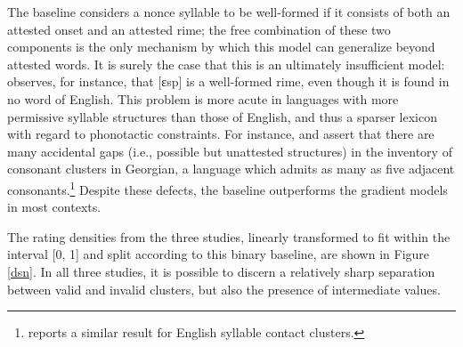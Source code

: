 The baseline considers a nonce syllable to be well-formed if it consists of both an attested onset and an attested rime; the free combination of these two components is the only mechanism by which this model can generalize beyond attested words. It is surely the case that this is an ultimately insufficient model: \citet{Albright2009a} observes, for instance, that [ɛsp] is a well-formed rime, even though it is found in no word of English. This problem is more acute in languages with more permissive syllable structures than those of English, and thus a sparser lexicon with regard to phonotactic constraints. For instance, \citet{Fischer-Jorgensen1952} and \citet{Vogt1954} assert that there are many accidental gaps (i.e., possible but unattested structures) in the inventory of consonant clusters in Georgian, a language which admits as many as five adjacent consonants.\footnote{
\citet{Gorman2012c}
reports a similar result for English syllable contact clusters.} Despite these defects, the baseline outperforms the gradient models in most contexts.

The rating densities from the three studies, linearly transformed to fit within the interval [0, 1] and split according to this binary baseline, are shown in Figure \ref{dsn}. In all three studies, it is possible to discern a relatively sharp separation between valid and invalid clusters, but also the presence of intermediate values.

